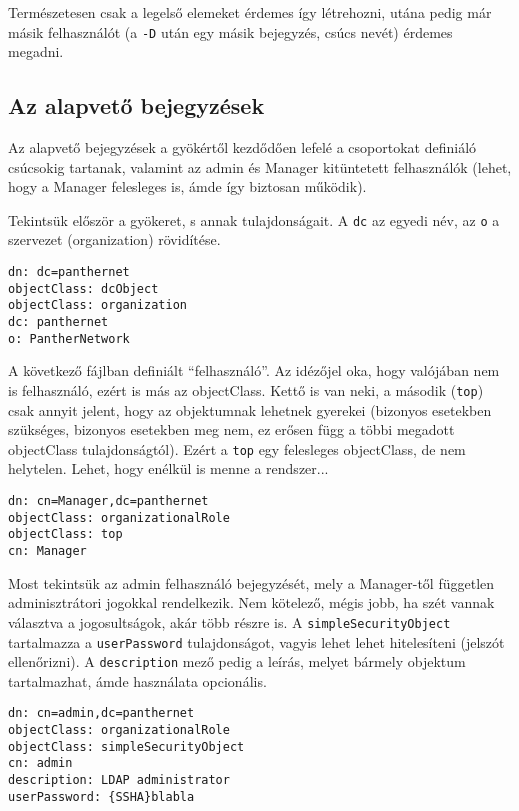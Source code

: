 Természetesen csak a legelső elemeket érdemes így létrehozni, utána pedig már másik felhasználót (a \texttt{-D} után egy
másik bejegyzés, csúcs nevét) érdemes megadni.


\subsection{Az alapvető bejegyzések}

Az alapvető bejegyzések a gyökértől kezdődően lefelé a csoportokat definiáló csúcsokig tartanak, valamint az admin és
Manager kitüntetett felhasználók (lehet, hogy a Manager felesleges is, ámde így biztosan működik).

Tekintsük először a gyökeret, s annak tulajdonságait.
A \texttt{dc} az egyedi név, az \texttt{o} a szervezet (organization) rövidítése.

\begin{Verbatim}[frame=single]
dn: dc=panthernet
objectClass: dcObject
objectClass: organization
dc: panthernet
o: PantherNetwork  
\end{Verbatim}


\noindent A következő  fájlban definiált ``felhasználó''. Az idézőjel oka, hogy valójában nem is
felhasználó, ezért is más az objectClass. Kettő is van neki, a második (\texttt{top}) csak annyit jelent, hogy az
objektumnak lehetnek gyerekei (bizonyos esetekben szükséges, bizonyos esetekben meg nem, ez erősen függ a többi megadott
objectClass tulajdonságtól). Ezért a \texttt{top} egy felesleges objectClass, de nem helytelen. Lehet, hogy enélkül is
menne a rendszer...


\begin{Verbatim}[frame=single]
dn: cn=Manager,dc=panthernet
objectClass: organizationalRole
objectClass: top
cn: Manager
\end{Verbatim}

\noindent Most tekintsük az admin felhasználó bejegyzését, mely a Manager-től független adminisztrátori jogokkal
rendelkezik. Nem kötelező, mégis jobb, ha szét vannak választva a jogosultságok, akár több részre is. A
\texttt{simpleSecurityObject} tartalmazza a \texttt{userPassword} tulajdonságot, vagyis lehet lehet hitelesíteni
(jelszót ellenőrizni). A \texttt{description} mező pedig a leírás, melyet bármely objektum tartalmazhat, ámde használata
opcionális.


\begin{Verbatim}[frame=single]
dn: cn=admin,dc=panthernet
objectClass: organizationalRole
objectClass: simpleSecurityObject
cn: admin
description: LDAP administrator
userPassword: {SSHA}blabla
\end{Verbatim}


